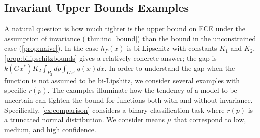 \documentclass[10pt]{article} %
\theoremstyle{definition}
\begin{document}
\subsection{Invariant Upper Bounds Examples} 
A natural question is how much tighter is the upper bound on ECE under the assumption of invariance (\cref{thm:inc_bound}) than the bound in the unconstrained case (\cref{prop:naive}). In the case $h_P(x)$ is bi-Lipschitz with constants $K_1$ and $K_2$,  \cref{prop:bilipschitzbounds} gives a relatively concrete answer; the gap is $ k(Gx^*)K_2\int_{P_2}dp\int_{Gx^\diamond}q(x)dx$.  In order to understand the gap when the function is not assumed to be bi-Lipshitz, we consider several examples with specific $r(p)$. The examples illuminate how the tendency of a model to be uncertain can tighten the bound for functions both with and without invariance.
Specifically, \cref{ex:comparison} considers a binary classification task where $r(p)$ is a truncated normal distribution. We consider means $\mu$ that correspond to low, medium, and high confidence.
\end{document}
